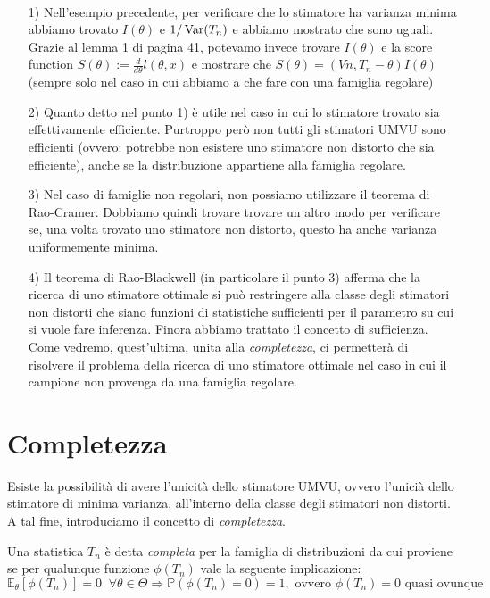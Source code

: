 \begin{oss}

~\begin{enumerate}
\item[1)] Nell'esempio precedente, per verificare che lo stimatore ha varianza minima abbiamo trovato $I(\theta)$ e $1/\operatorname{Var}(T_n)$ e abbiamo mostrato che sono uguali. Grazie al lemma 1 di pagina 41, potevamo invece trovare $I(\theta)$ e la score function $S(\theta):= \frac{d}{d\theta} l(\theta,\underline{x})$ e mostrare che $S(\theta)=(V{n,T_n}-\theta) I(\theta)$ (sempre solo nel caso in cui abbiamo a che fare con una famiglia regolare)
\item[2)] Quanto detto nel punto 1) è utile nel caso in cui lo stimatore trovato sia effettivamente efficiente. Purtroppo però non tutti gli stimatori UMVU sono efficienti (ovvero: potrebbe non esistere uno stimatore non distorto che sia efficiente), anche se la distribuzione appartiene alla famiglia regolare.
\item[3)] Nel caso di famiglie non regolari, non possiamo utilizzare il teorema di Rao-Cramer. Dobbiamo quindi trovare trovare un altro modo per verificare se, una volta trovato uno stimatore non distorto, questo ha anche varianza uniformemente minima.
\item[4)] Il teorema di Rao-Blackwell (in particolare il punto 3) afferma che la ricerca di uno stimatore ottimale si può restringere alla classe degli stimatori non distorti che siano funzioni di statistiche sufficienti per il parametro su cui si vuole fare inferenza. Finora abbiamo trattato il concetto di sufficienza. Come vedremo, quest'ultima, unita alla \emph{completezza}, ci permetterà di risolvere il problema della ricerca di uno stimatore ottimale nel caso in cui il campione non provenga da una famiglia regolare.
\end{enumerate}
\end{oss}


\section{Completezza}

Esiste la possibilità di avere l'unicità dello stimatore UMVU, ovvero l'unicià dello stimatore di minima varianza, all'interno della classe degli stimatori non distorti. A tal fine, introduciamo il concetto di \emph{completezza}.

\begin{definizione}
Una statistica $T_n$ è detta \emph{completa} per la famiglia di distribuzioni da cui proviene se per qualunque funzione $\phi(T_n)$ vale la seguente implicazione:
$$\mathbb{E}_{\theta}[\phi(T_n)]=0 \; \; \forall \theta \in \Theta \Longrightarrow \mathbb{P}(\phi(T_n)=0)=1, \text{ ovvero } \phi(T_n) = 0 \text{ quasi ovunque}$$
\end{definizione}

